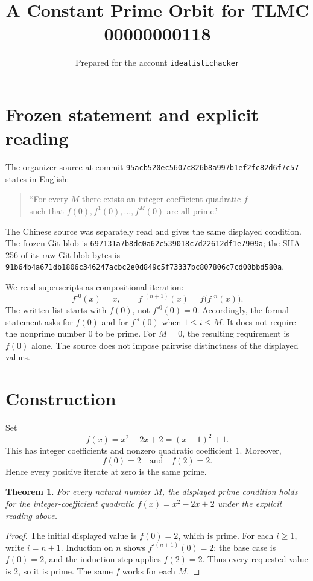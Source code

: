 \documentclass[11pt]{article}
\title{A Constant Prime Orbit for TLMC 00000000118}
\author{Prepared for the account \texttt{idealistichacker}}
\date{}
\newtheorem{theorem}{Theorem}
\begin{document}
\maketitle

\section*{Frozen statement and explicit reading}
The organizer source at commit
\texttt{95acb520ec5607c826b8a997b1ef2fc82d6f7c57} states in English:
\begin{quote}\raggedright
``For every $M$ there exists an integer-coefficient quadratic $f$\\
such that $f(0),f^1(0),\ldots,f^M(0)$ are all prime.'
\end{quote}
The Chinese source was separately read and gives the same displayed condition.
The frozen Git blob is
\texttt{697131a7b8dc0a62c539018c7d22612df1e7909a}; the SHA-256 of its raw
Git-blob bytes is
\texttt{91b64b4a671db1806c346247acbc2e0d849c5f73337bc807806c7cd00bbd580a}.

We read superscripts as compositional iteration:
\[
 f^{\circ0}(x)=x,\qquad f^{\circ(n+1)}(x)=f\bigl(f^{\circ n}(x)\bigr).
\]
The written list starts with $f(0)$, not $f^{\circ0}(0)=0$. Accordingly, the
formal statement asks for $f(0)$ and for $f^{\circ i}(0)$ when
$1\leq i\leq M$. It does not require the nonprime number $0$ to be prime.
For $M=0$, the resulting requirement is $f(0)$ alone. The source does not
impose pairwise distinctness of the displayed values.

\section*{Construction}
Set
\[
  f(x)=x^2-2x+2=(x-1)^2+1.
\]
This has integer coefficients and nonzero quadratic coefficient $1$. Moreover,
\[
  f(0)=2\quad\text{and}\quad f(2)=2.
\]
Hence every positive iterate at zero is the same prime.

\begin{theorem}
For every natural number $M$, the displayed prime condition holds for the
integer-coefficient quadratic $f(x)=x^2-2x+2$ under the explicit reading above.
\end{theorem}
\begin{proof}
The initial displayed value is $f(0)=2$, which is prime. For each $i\geq1$,
write $i=n+1$. Induction on $n$ shows $f^{\circ(n+1)}(0)=2$: the base case is
$f(0)=2$, and the induction step applies $f(2)=2$. Thus every requested value
is $2$, so it is prime. The same $f$ works for each $M$.
\end{proof}
\end{document}
